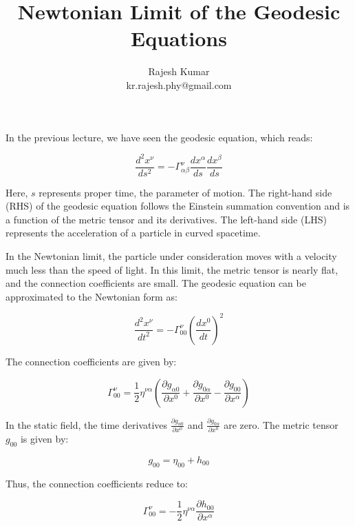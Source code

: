 \documentclass[a4paper, 12pt]{article}
\title{Newtonian Limit of the Geodesic Equations}
\author{Rajesh Kumar\\kr.rajesh.phy@gmail.com}
\date{}
\begin{document}
\maketitle


In the previous lecture, we have seen the geodesic equation, which reads:

\begin{equation}
    \frac{d^2x^\nu}{ds^2}=-\Gamma^\nu_{\alpha\beta}\frac{dx^\alpha}{ds}\frac{dx^\beta}{ds}
\end{equation}

Here, $s$ represents proper time, the parameter of motion. The right-hand side (RHS) of the geodesic equation follows the Einstein summation convention and is a function of the metric tensor and its derivatives. The left-hand side (LHS) represents the acceleration of a particle in curved spacetime.

In the Newtonian limit, the particle under consideration moves with a velocity much less than the speed of light. In this limit, the metric tensor is nearly flat, and the connection coefficients are small. The geodesic equation can be approximated to the Newtonian form as:

\begin{equation}
    \frac{d^2x^\nu}{dt^2}=-\Gamma^\nu_{00}\left(\frac{dx^0}{dt}\right)^2
\end{equation}

The connection coefficients are given by:

\begin{equation}
    \Gamma^\nu_{00}=\frac{1}{2}\eta^{\nu\alpha}\left(\frac{\partial g_{\alpha 0}}{\partial x^0}+\frac{\partial g_{0\alpha }}{\partial x^0}-\frac{\partial g_{00}}{\partial x^\alpha}\right)
\end{equation}

In the static field, the time derivatives $\frac{\partial g_{\alpha 0}}{\partial x^0}$ and $\frac{\partial g_{0\alpha}}{\partial x^0}$ are zero. The metric tensor $g_{00}$ is given by:

\begin{equation}
    g_{00}=\eta_{00}+h_{00}
\end{equation}

Thus, the connection coefficients reduce to:

\begin{equation}
    \Gamma^\nu_{00}=-\frac{1}{2}\eta^{\nu\alpha}\frac{\partial h_{0 0}}{\partial x^\alpha}
\end{equation}
\end{document}
